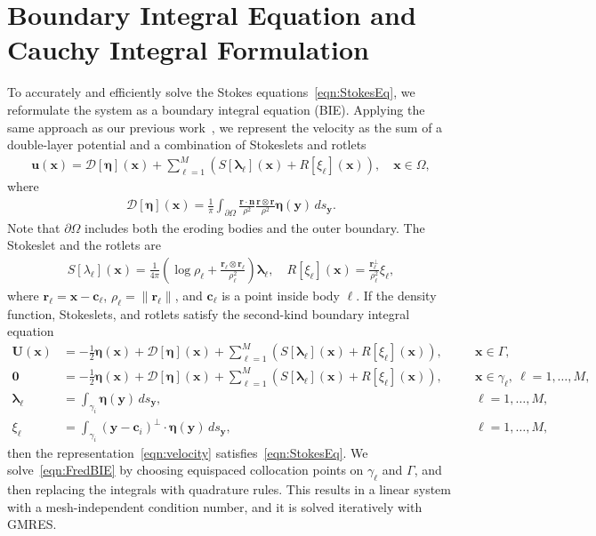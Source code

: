 \documentclass[3p]{elsarticle}
\newcommand{\bd}{{\partial}}
\newcommand{\cc}{{\mathbf{c}}}
\newcommand{\DDD}{{\boldsymbol{\mathcal D}}}
\newcommand{\eeta}{{\boldsymbol\eta}}
\newcommand{\llambda}{{\boldsymbol\lambda}}
\newcommand{\nn}{{\mathbf{n}}}
\newcommand{\rr}{{\mathbf{r}}}
\newcommand{\uu}{{\mathbf{u}}}
\newcommand{\UU}{{\mathbf{U}}}
\newcommand{\xx}{{\mathbf{x}}}
\newcommand{\yy}{{\mathbf{y}}}
\begin{document}
\section{Boundary Integral Equation and Cauchy Integral Formulation}
\label{sec:DLP}
To accurately and efficiently solve the Stokes
  equations~\eqref{eqn:StokesEq}, we reformulate the system as a
  boundary integral equation (BIE). Applying the same approach as our
  previous work~\citep{qua-moo2018}, we represent the velocity as the
  sum of a double-layer potential and a combination of Stokeslets and
  rotlets~\cite{pow-mir1987}
\begin{align}
  \uu(\xx) = \DDD[\eeta](\xx) + \sum_{\ell=1}^{M}\left(
    S[\llambda_\ell](\xx) + R[\xi_\ell](\xx)\right), 
    \quad \xx \in \Omega,
  \label{eqn:velocity}
\end{align}
where 
\begin{align}
  \DDD[\eeta](\xx) = \frac{1}{\pi}\int_{\bd\Omega} 
  \frac{\rr \cdot \nn}{\rho^2} \frac{\rr \otimes \rr}{\rho^2}
  \eeta(\yy) \, ds_\yy.
  \label{eqn:velocityDLP}
\end{align}
Note that $\bd\Omega$ includes both the eroding bodies and the outer
boundary. The Stokeslet and the rotlets are
\begin{align}
  S[\lambda_\ell](\xx) = \frac{1}{4\pi} \left(\log \rho_\ell +
  \frac{\rr_\ell \otimes \rr_\ell}{\rho_\ell^2} \right) \llambda_\ell,
  \quad
  R[\xi_\ell](\xx) = \frac{\rr_\ell^\perp}{\rho_\ell^2}\xi_\ell,
\end{align}
where $\rr_\ell = \xx - \cc_\ell$, $\rho_\ell = \|\rr_\ell\|$, and
$\cc_\ell$ is a point inside body $\ell$. If the density function,
Stokeslets, and rotlets satisfy the second-kind boundary integral
equation
\begin{subequations}
  \label{eqn:FredBIE}
  \begin{alignat}{3}
    \UU(\xx) &= -\frac{1}{2}\eeta(\xx) + \DDD[\eeta](\xx) + 
      \sum_{\ell=1}^{M}\left(S[\llambda_\ell](\xx) + R[\xi_\ell](\xx)\right), 
      \quad &&\xx \in \Gamma, \\
    \mathbf{0} &= -\frac{1}{2}\eeta(\xx) + \DDD[\eeta](\xx) + 
      \sum_{\ell=1}^{M}\left(S[\llambda_\ell](\xx) + R[\xi_\ell](\xx)\right), 
      &&\xx \in \gamma_\ell, \: \ell = 1,\ldots,M, \\
    \llambda_\ell &= \int_{\gamma_i} \eeta(\yy) \, ds_\yy, 
      &&\ell = 1,\ldots,M, \\
    \xi_\ell &= \int_{\gamma_i} (\yy - \cc_i)^\perp \cdot 
      \eeta(\yy) \, ds_\yy, &&\ell = 1,\ldots,M,
  \end{alignat}
\end{subequations}
then the representation~\eqref{eqn:velocity}
satisfies~\eqref{eqn:StokesEq}. We solve~\eqref{eqn:FredBIE} by choosing
equispaced collocation points on $\gamma_\ell$ and $\Gamma$, and then
replacing the integrals with quadrature rules. This results in a linear
system with a mesh-independent condition number, and it is solved
iteratively with GMRES.
\end{document}
